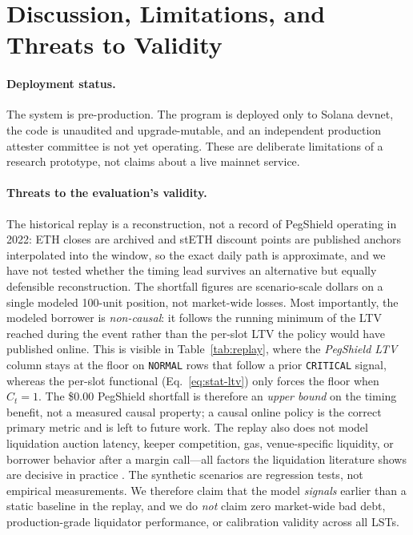 \documentclass[aps,prx,reprint,nofootinbib,longbibliography]{revtex4-2}
\begin{document}
\section{Discussion, Limitations, and Threats to Validity}
\label{sec:discussion}

\paragraph{Deployment status.}
The system is pre-production. The program is deployed only to Solana devnet, the
code is unaudited and upgrade-mutable, and an independent production attester
committee is not yet operating. These are deliberate limitations of a research
prototype, not claims about a live mainnet service.

\paragraph{Threats to the evaluation's validity.}
The historical replay is a reconstruction, not a record of PegShield operating in
2022: ETH closes are archived and stETH discount points are published anchors
interpolated into the window, so the exact daily path is approximate, and we have
not tested whether the timing lead survives an alternative but equally defensible
reconstruction. The shortfall figures are scenario-scale dollars on a single modeled
100-unit position, not market-wide losses. Most importantly, the modeled borrower is
\emph{non-causal}: it follows the running minimum of the LTV reached during the
event rather than the per-slot LTV the policy would have published online. This is
visible in Table~\ref{tab:replay}, where the \emph{PegShield LTV} column stays at
the floor on \texttt{NORMAL} rows that follow a prior \texttt{CRITICAL} signal,
whereas the per-slot functional (Eq.~\eqref{eq:stat-ltv}) only forces the floor when
$C_t=1$. The \$0.00 PegShield shortfall is therefore an \emph{upper bound} on the
timing benefit, not a measured causal property; a causal online policy is the
correct primary metric and is left to future work. The replay also does not model
liquidation auction latency, keeper competition, gas, venue-specific liquidity, or
borrower behavior after a margin call---all factors the liquidation literature shows
are decisive in practice
\cite{qin2021empirical,perez2021knifeedge,warmuz2022toxic}. The synthetic scenarios
are regression tests, not empirical measurements. We therefore claim that the model
\emph{signals} earlier than a static baseline in the replay, and we do \emph{not}
claim zero market-wide bad debt, production-grade liquidator performance, or
calibration validity across all LSTs.
\end{document}
